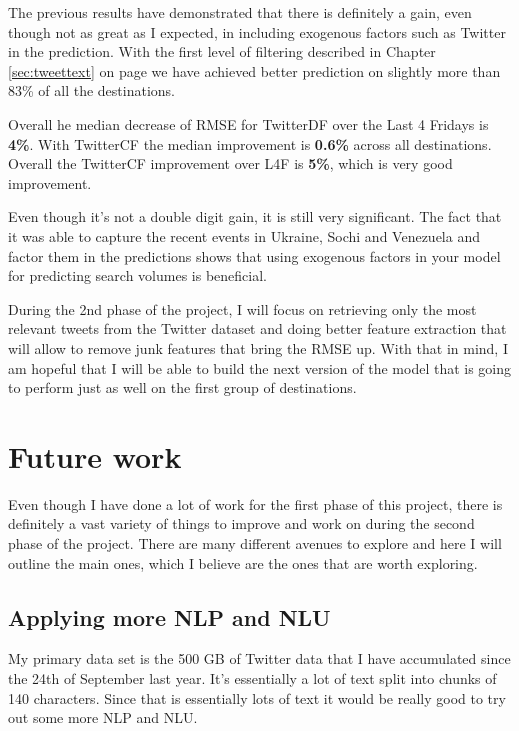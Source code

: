 \documentclass[minf,twoside,singlespacing,parskip,frontabs]{infthesis}
\begin{document}
The previous results have demonstrated that there is definitely a gain, even though not as great as I expected, in including exogenous factors such as Twitter in the prediction. With the first level of filtering described in Chapter \ref{sec:tweettext} on page \pageref{sec:tweettext} we have achieved better prediction on slightly more than 83\% of all the destinations.  


Overall he median decrease of RMSE for TwitterDF over the Last 4 Fridays is \textbf{4\%}. With TwitterCF the median improvement is \textbf{0.6\%} across all destinations. Overall the TwitterCF improvement over L4F is \textbf{5\%}, which is very good improvement. 


Even though it's not a double digit gain, it is still very significant. The fact that it was able to capture the recent events in Ukraine, Sochi and Venezuela and factor them in the predictions shows that using exogenous factors in your model for predicting search volumes is beneficial.


During the 2nd phase of the project, I will focus on retrieving only the most relevant tweets from the Twitter dataset and doing better feature extraction that will allow to remove junk features that bring the RMSE up. With that in mind, I am hopeful that I will be able to build the next version of the model that is going to perform just as well on the first group of destinations. 


\chapter{Future work}
\label{chap:future-work}


Even though I have done a lot of work for the first phase of this project, there is definitely a vast variety of things to improve and work on during the second phase of the project. There are many different avenues to explore and here I will outline the main ones, which I believe are the ones that are worth exploring. 


\section{Applying more NLP and NLU}


My primary data set is the 500 GB of Twitter data that I have accumulated since the 24th of September last year. It's essentially a lot of text split into chunks of 140 characters. Since that is essentially lots of text it would be really good to try out some more NLP and NLU. 
\end{document}
